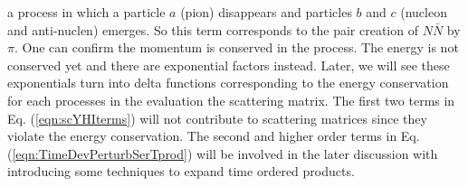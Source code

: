 a process in which a particle $a$ (pion) disappears and particles $b$ and $c$
(nucleon and anti-nuclen) emerges. So this term corresponds to the pair creation
of $N\bar{N}$ by $\pi$. One can confirm the momentum is conserved in the process.
The energy is not conserved yet and there are exponential factors instead.
Later, we will see these exponentials turn into delta functions corresponding to
the energy conservation for each processes in the evaluation the scattering matrix.
The first two terms in Eq. (\ref{eqn:scYHIterms}) will not contribute to scattering matrices
since they violate the energy conservation.
The second and higher order terms in Eq. (\ref{eqn:TimeDevPerturbSerTprod}) will be
involved in the later discussion with introducing some techniques to expand time ordered
products.
\\

